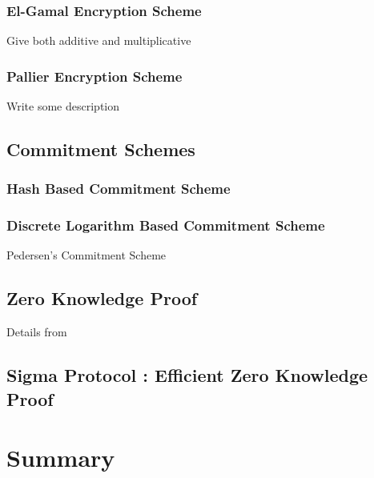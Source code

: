      \subsubsection{El-Gamal Encryption Scheme}
        Give both additive and multiplicative
     \subsubsection{Pallier Encryption Scheme}
        Write some description
     \subsection{Commitment Schemes}   
        \subsubsection{Hash Based Commitment Scheme}
        \subsubsection{Discrete Logarithm Based Commitment Scheme}
         Pedersen's Commitment Scheme
     \subsection{Zero Knowledge Proof}
  		Details from 
  	 \subsection{Sigma Protocol : Efficient Zero Knowledge Proof}
  



\section{Summary}










